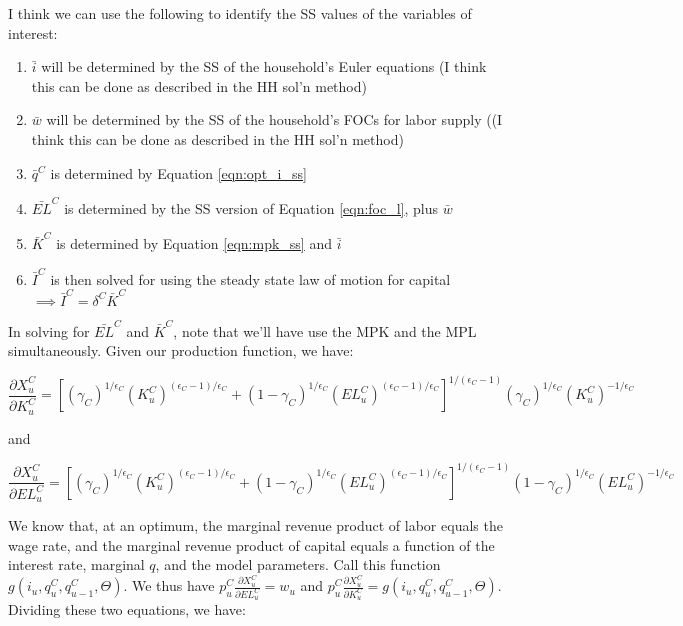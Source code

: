 \documentclass[article,11pt,letterpaper,fleqn]{article}
\theoremstyle{definition}
\numberwithin{equation}{section}
\begin{document}
I think we can use the following to identify the SS values of the variables of interest:
\begin{enumerate}
\item $\bar{i}$ will be determined by the SS of the household's Euler equations (I think this can be done as described in the HH sol'n method)
\item $\bar{w}$ will be determined by the SS of the household's FOCs for labor supply ((I think this can be done as described in the HH sol'n method)
\item $\bar{q}^{C}$ is determined by Equation \ref{eqn:opt_i_ss}
\item $\bar{EL}^{C}$ is determined by the SS version of Equation \ref{eqn:foc_l}, plus $\bar{w}$
\item $\bar{K}^{C}$ is determined by Equation \ref{eqn:mpk_ss} and $\bar{i}$
\item $\bar{I}^{C}$ is then solved for using the steady state law of motion for capital $\implies \bar{I}^{C}=\delta^{C}\bar{K}^{C}$
\end{enumerate}

In solving for $\bar{EL}^{C}$ and $\bar{K}^{C}$, note that we'll have use the MPK and the MPL simultaneously.  Given our production function, we have:

\begin{equation}
\label{eqn:mpk}
\frac{\partial X^{C}_{u}}{\partial K^{C}_{u}} = \left[(\gamma_{C})^{1/\epsilon_{C}}(K^{C}_{u})^{(\epsilon_{C}-1)/\epsilon_{C}}+(1-\gamma_{C})^{1/\epsilon_{C}}(EL^{C}_{u})^{(\epsilon_{C}-1)/\epsilon_{C}}\right]^{1/(\epsilon_{C}-1)}(\gamma_{C})^{1/\epsilon_{C}}(K^{C}_{u})^{-1/\epsilon_{C}}
\end{equation}

and 

\begin{equation}
\label{eqn:mpl}
\frac{\partial X^{C}_{u}}{\partial EL^{C}_{u}} = \left[(\gamma_{C})^{1/\epsilon_{C}}(K^{C}_{u})^{(\epsilon_{C}-1)/\epsilon_{C}}+(1-\gamma_{C})^{1/\epsilon_{C}}(EL^{C}_{u})^{(\epsilon_{C}-1)/\epsilon_{C}}\right]^{1/(\epsilon_{C}-1)}(1-\gamma_{C})^{1/\epsilon_{C}}(EL^{C}_{u})^{-1/\epsilon_{C}}
\end{equation}

We know that, at an optimum, the marginal revenue product of labor equals the wage rate, and the marginal revenue product of capital equals a function of the interest rate, marginal $q$, and the model parameters.  Call this function $g(i_{u},q^{C}_{u},q^{C}_{u-1},\Theta)$.  We thus have $p^{C}_{u}\frac{\partial X^{C}_{u}}{\partial EL^{C}_{u}} =w_{u}$ and $p^{C}_{u}\frac{\partial X^{C}_{u}}{\partial K^{C}_{u}}=g(i_{u},q^{C}_{u},q^{C}_{u-1},\Theta)$.  Dividing these two equations, we have:
\end{document}
